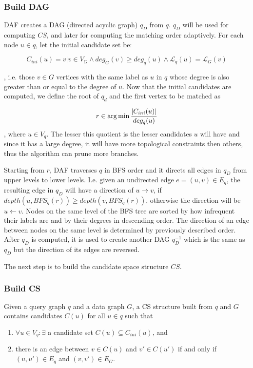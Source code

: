 \subsubsection{Build DAG}

DAF creates a DAG (directed acyclic graph) $q_D$ from $q$. $q_D$ will be used for computing $CS$, and later
for computing the matching order adaptively. For each node $u \in q$, let the initial candidate set be:

\[ C_{ini}(u) = {v | v \in V_G \land deg_G(v) \geq deg_q(u) \land \mathcal{L}_q(u) = \mathcal{L}_G(v)} \]

, i.e. those $v \in G$ vertices with the same label as $u$ in $q$ whose degree is also greater than or 
equal to the degree of $u$. Now that the initial candidates are computed, we define the root of $q_d$
and the first vertex to be matched as

\[ r \in \operatorname*{arg\,min} \frac{|C_{ini}(u)|}{deg_q(u)} \], where $u \in V_q$. The lesser this quotient is the 
lesser candidates $u$ will have and since it has a large degree, it will have more topological constraints 
then others, thus the algorithm can prune more branches.

Starting from $r$, DAF traverses $q$ in BFS order and it directs all edges in $q_D$ from upper levels to
lower levels. I.e. given an undirected edge $e = (u, v) \in E_q$, the resulting edge in $q_D$ will have
a direction of $u \rightarrow v$, if $depth(u, BFS_q(r)) \geq depth(v, BFS_q(r))$, otherwise the direction
will be $u \leftarrow v$. Nodes on the same level of the BFS tree are sorted by how infrequent their labels
are and by their degrees in descending order. The direction of an edge between nodes on the same level is 
determined by previously described order. After $q_D$ is computed, it is used to create another DAG $q^{-1}_D$
which is the same as $q_D$ but the direction of its edges are reversed.

The next step is to build the candidate space structure $CS$.

\subsubsection{Build CS}

Given a query graph $q$ and a data graph $G$, a CS structure built from $q$ and $G$ contains candidates $C(u)$
for all $u \in q$ such that

\begin{enumerate}
    \item $\forall u \in V_q : \exists$ a candidate set $C(u) \subseteq C_{ini}(u)$, and
    \item there is an edge between $v \in C(u)$ and $v' \in C(u')$ if and only if $(u, u') \in E_q$ and $(v, v') \in E_G$.
\end{enumerate}

